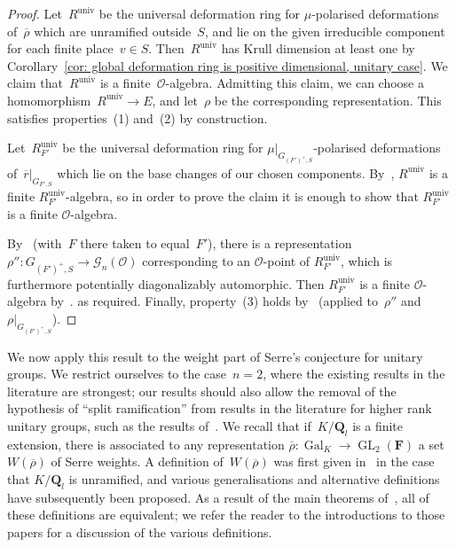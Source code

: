 \documentclass{amsart}
\renewcommand{\mathbb}{\mathbf}
\renewcommand{\ell}{l}
\newcommand{\univ}{{\operatorname{univ}}}
\theoremstyle{definition}
\theoremstyle{remark}
\newcommand{\mar}[1]{}
\newcommand{\mar}[1]{\marginpar{\raggedright\tiny squirrel #1}}
\newcommand{\F}{\FF}
\newcommand{\Q}{\QQ}
\newcommand{\FF}{{\mathbb F}}
\newcommand{\QQ}{{\mathbb Q}}
\newcommand{\cG}{{\mathcal G}}
\newcommand{\cO}{{\mathcal O}}
\newcommand{\Ql}{\Q_{\ell}}
\DeclareMathOperator{\Gal}{Gal}
\DeclareMathOperator{\GL}{GL}
\newcommand{\rhobar}{\overline{\rho}}
\newcommand{\rbar}{\overline{r}}
\begin{document}
\begin{proof}  Let~$R^\univ$ be the universal deformation ring for $\mu$-polarised
  deformations of~$\rhobar$ which are unramified outside~$S$, and lie on
  the given  irreducible component for each finite place~$v\in S$. Then~$R^\univ$ has Krull
  dimension at least one by Corollary~\ref{cor: global deformation ring is positive dimensional, unitary
  case}. We claim that~$R^\univ$ is a finite~$\cO$-algebra. Admitting
this claim, we can choose a homomorphism~$R^\univ\to E$, and let~$\rho$
be the corresponding representation. This satisfies properties~(1)
and~(2) by construction.

Let~$R_{F'}^\univ$ be the universal
deformation ring for  $\mu|_{G_{(F')^+,S}}$-polarised
  deformations of~$\rbar|_{G_{F',S}}$ which lie on the base changes of
  our chosen components. %
  By~\cite[Lem.\ 1.2.3 (1)]{BLGGT}, $R^\univ$ is a
  finite $R_{F'}^\univ$-algebra, so in order to prove the claim it is enough to show that
  $R_{F'}^\univ$ is a finite $\cO$-algebra.

By~\cite[Thm.\ A.4.1]{MR3072811} (with~$F$ there taken to equal~$F'$),
there is a representation~$\rho'':G_{(F')^+,S}\to\cG_n(\cO)$
corresponding to an $\cO$-point of $R_{F'}^\univ$, which is
furthermore potentially diagonalizably automorphic. Then
$R_{F'}^\univ$ is a finite $\cO$-algebra by~\cite[Thm.\ 2.3.2]{BLGGT}.
as required. Finally, property~(3) holds by~\cite[Thm.\ 2.3.2]{BLGGT}
(applied to~$\rho''$ and~$\rho|_{G_{(F')^+,S}}$). 
\end{proof}
We now apply this result to the weight part of Serre's conjecture for
unitary groups. We
restrict ourselves to the case~$n=2$, where the existing results in
the literature are strongest; our results should also allow the
removal of the hypothesis of ``split ramification'' from results in
the literature for higher rank unitary groups, such as the results
of~\cite{blggUn}. We recall that if~$K/\Ql$ is a finite extension,
there is associated to any representation $\rhobar:\Gal_K\to\GL_2(\F)$
a set~$W(\rhobar)$ of Serre weights. A definition of~$W(\rhobar)$ was
first given in~\cite{bdj} in the case that $K/\Ql$ is unramified, and
various generalisations and alternative definitions have subsequently
been proposed. As a result of the main theorems
of~\cite{MR3324938,2016arXiv160806059C}, all of these definitions are
equivalent; we refer the reader to the introductions to those papers
for a discussion of the various definitions.
\end{document}
